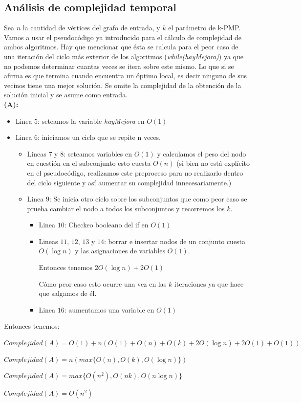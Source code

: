 \subsection{Análisis de complejidad temporal}
Sea $n$ la cantidad de vértices del grafo de entrada, y $k$ el parámetro de k-PMP. Vamos a usar el pseudocódigo ya introducido para el cálculo de complejidad de ambos algoritmos. Hay que mencionar que ésta se calcula para el peor caso de una iteración del ciclo más exterior de los algoritmos (\textit{while(hayMejora)}) ya que no podemos determinar cuantas veces se itera sobre este mismo. Lo que si se afirma es que termina cuando encuentra un óptimo local, es decir ninguno de sus vecinos tiene una mejor solución. Se omite la complejidad de la obtención de la solución inicial y se asume como entrada.
\\

\textbf{(A):}

\begin{itemize}
    \item Linea $5$: seteamos la variable \textit{hayMejora} en $O(1)$
    \item Linea $6$: iniciamos un ciclo que se repite n veces.
    \begin{itemize}
        \item Lineas $7$ y $8$: seteamos variables en $O(1)$ y calculamos el peso del nodo en cuestión en el subconjunto esto cuesta $O(n)$ (si bien no está explícito en el pseudocódigo, realizamos este preproceso para no realizarlo dentro del ciclo siguiente y así aumentar su complejidad innecesariamente.)
        \item Linea $9$: Se inicia otro ciclo sobre los subconjuntos que como peor caso se prueba cambiar el nodo a todos los subconjuntos y recorremos los $k$.
        \begin{itemize}
            \item Linea $10$: Checkeo booleano del if en $O(1)$
            \item Lineas $11$, $12$, $13$ y $14$: borrar e insertar nodos de un conjunto cuesta $O(\log n)$ y las asignaciones de variables $O(1)$. 

            Entonces tenemos $2O(\log n) + 2O(1)$

            Cómo peor caso esto ocurre una vez en las $k$ iteraciones ya que hace que salgamos de él.
            \item Linea $16$: aumentamos una variable en $O(1)$
        \end{itemize}
    \end{itemize}
\end{itemize}
Entonces tenemos:
\begin{center}
    $Complejidad(A) = O(1) + n(O(1)+O(n)+O(k)+2O(\log n)+2O(1)+O(1))$

    $Complejidad(A) = n(max\{O(n),O(k),O(\log n)\})$

    $Complejidad(A) = max\{O(n^2),O(nk),O(n\log n)\}$

    $Complejidad(A) = O(n^2)$
\end{center}

